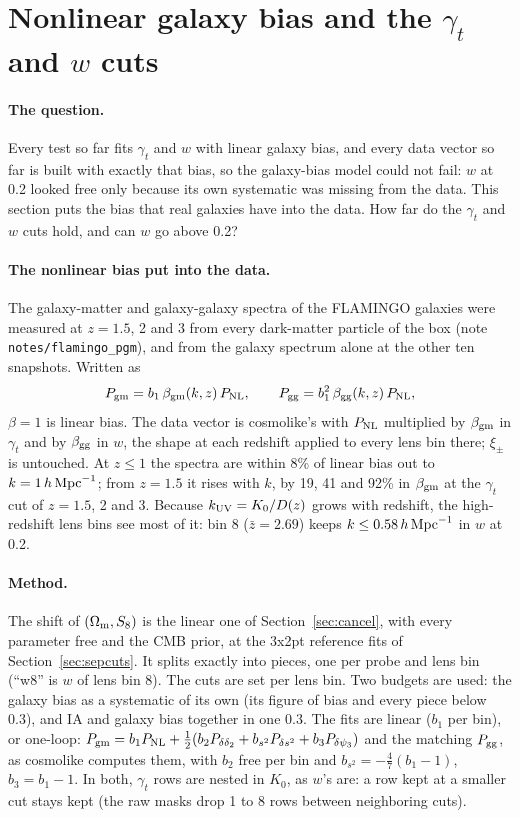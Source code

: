 \documentclass[11pt]{article}
\newcommand{\hMpc}{\,h\,{\rm Mpc}^{-1}}
\newcommand{\kuv}{k_{\rm UV}}
\newcommand{\PNL}{P_{\rm NL}}
\newcommand{\Om}{\Omega_{\rm m}}
\newcommand{\Tol}{0.3}
\begin{document}
\section{Nonlinear galaxy bias and the $\gamma_t$ and $w$ cuts}
\label{sec:gbias}

\paragraph{The question.}
Every test so far fits $\gamma_t$ and $w$ with linear galaxy bias, and every
data vector so far is built with exactly that bias, so the galaxy-bias model
could not fail: $w$ at 0.2 looked free only because its own systematic was
missing from the data. This section puts the bias that real galaxies have
into the data. How far do the $\gamma_t$ and $w$ cuts hold, and can $w$ go
above 0.2?

\paragraph{The nonlinear bias put into the data.}
The galaxy-matter and galaxy-galaxy spectra of the FLAMINGO galaxies were
measured at $z = 1.5$, 2 and 3 from every dark-matter particle of the box
(note \texttt{notes/flamingo\_pgm}), and from the galaxy spectrum alone at the
other ten snapshots. Written as
\begin{equation}
P_{\rm gm} = b_1\,\beta_{\rm gm}(k, z)\,\PNL, \qquad
P_{\rm gg} = b_1^2\,\beta_{\rm gg}(k, z)\,\PNL,
\end{equation}
$\beta = 1$ is linear bias. The data vector is cosmolike's with $\PNL$
multiplied by $\beta_{\rm gm}$ in $\gamma_t$ and by $\beta_{\rm gg}$ in $w$,
the shape at each redshift applied to every lens bin there; $\xi_\pm$ is
untouched. At $z \le 1$ the spectra are within 8\% of linear bias out to
$k = 1\hMpc$; from $z = 1.5$ it rises with $k$, by 19, 41 and 92\% in
$\beta_{\rm gm}$ at the $\gamma_t$ cut of $z = 1.5$, 2 and 3. Because
$\kuv = K_0/D(z)$ grows with redshift, the high-redshift lens bins see most
of it: bin 8 ($\bar z = 2.69$) keeps $k \le 0.58\hMpc$ in $w$ at 0.2.

\paragraph{Method.}
The shift of $(\Om, S_8)$ is the linear one of Section~\ref{sec:cancel},
with every parameter free and the CMB prior, at the 3x2pt reference fits of
Section~\ref{sec:sepcuts}. It splits exactly into pieces, one per probe and
lens bin (``w8'' is $w$ of lens bin 8). The cuts are set per lens bin. Two
budgets are used: the galaxy bias as a systematic of its own (its figure of
bias and every piece below \Tol), and IA and galaxy bias together in one
\Tol. The fits are linear ($b_1$ per bin), or one-loop: $P_{\rm gm} = b_1\PNL
+ \tfrac12(b_2 P_{\delta\delta_2} + b_{s^2} P_{\delta s^2} + b_3
P_{\delta\psi_3})$ and the matching $P_{\rm gg}$, as cosmolike computes them,
with $b_2$ free per bin and $b_{s^2} = -\tfrac47(b_1 - 1)$, $b_3 = b_1 - 1$.
In both, $\gamma_t$ rows are nested in $K_0$, as $w$'s are: a row kept at a
smaller cut stays kept (the raw masks drop 1 to 8 rows between neighboring
cuts).
\end{document}

